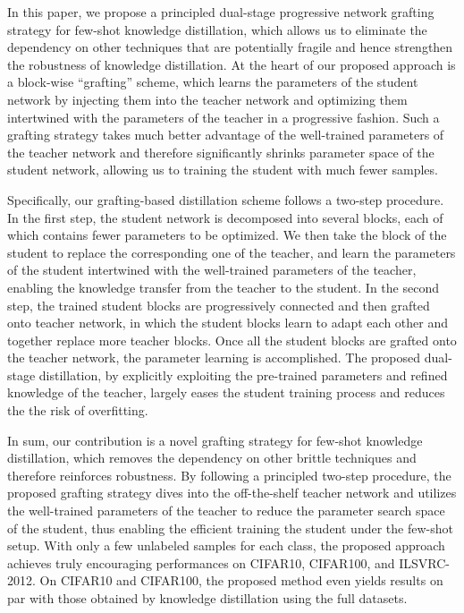 \documentclass[letterpaper]{article} %
\begin{document}
{    In this paper, we propose a principled dual-stage
    progressive network grafting strategy
    for few-shot knowledge distillation,
    which allows us to eliminate the dependency on
    other techniques that are potentially fragile
    and hence strengthen the robustness of knowledge distillation.
    At the heart of our proposed approach is a
    block-wise ``grafting'' scheme, which
    learns the parameters of the student network
    by injecting them into the teacher network
    and optimizing them intertwined with the
    parameters of the teacher in a progressive fashion.
    Such a grafting strategy takes much better advantage of
    the well-trained parameters of the teacher network
    and therefore significantly shrinks parameter space of the student network,
    allowing us to training the student with much fewer samples.

    Specifically, our grafting-based distillation scheme follows
    a two-step procedure. In the first step, the student network is decomposed
    into several blocks, each of which contains fewer parameters to be optimized.
    We then take the block of the student to replace the corresponding
    one of the teacher, and learn the parameters of the student intertwined
    with the well-trained parameters of the teacher, enabling the
    knowledge transfer from the teacher to the student.
    In the second step, the trained student blocks
    are progressively connected and then grafted onto teacher network,
    in which the student blocks learn to adapt each other and
    together replace more teacher blocks.
    Once all the student blocks are grafted onto the teacher network,
    the parameter learning is accomplished.
    The proposed dual-stage distillation, by explicitly exploiting
    the pre-trained parameters and refined knowledge of the teacher,
    largely eases the student training process and reduces the
    the risk of overfitting.

    In sum, our contribution is a novel grafting
    strategy for few-shot knowledge distillation,
    which removes the dependency on other brittle
    techniques and therefore reinforces robustness.
    By following a principled two-step procedure,
    the proposed grafting strategy dives into
    the off-the-shelf teacher network
    and utilizes the well-trained parameters of the teacher
    to reduce the parameter search space of the student,
    thus enabling the efficient training the student under
    the few-shot setup.
    With only a few unlabeled samples for each class,
    the proposed approach achieves truly encouraging performances
    on CIFAR10, CIFAR100, and ILSVRC-2012.
    On  CIFAR10 and CIFAR100, the proposed method even yields results
    on par with those obtained by knowledge distillation using the full datasets.

}
\end{document}
